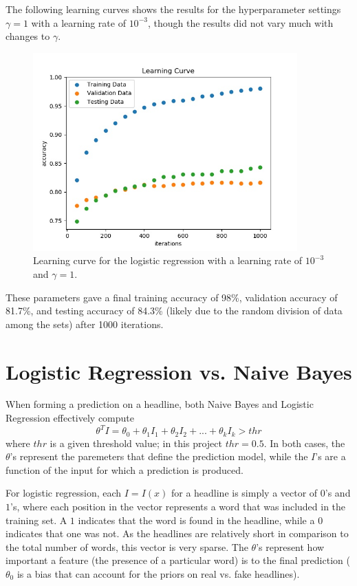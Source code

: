\documentclass{article}
\begin{document}
   The following learning curves shows the results for the hyperparameter settings $\gamma = 1$ with a learning
   rate of $10^{-3}$, though the results did not vary much with changes to $\gamma$.
   \begin{figure}[h] \centering
      \includegraphics[width=4in]{resources/part4}
      \caption{ Learning curve for the logistic regression with a learning rate of $10^{-3}$ and
            $\gamma = 1$.}
   \end{figure}

   These parameters gave a final training accuracy of 98\%, validation accuracy of 81.7\%, and testing
   accuracy of 84.3\% (likely due to the random division of data among the sets) after 1000 iterations.



   \section{Logistic Regression vs. Naive Bayes}
   When forming a prediction on a headline, both Naive Bayes and Logistic Regression effectively compute
   \begin{equation*}
      \theta^T I = \theta_0 + \theta_1 I_1 + \theta_2 I_2 + ... + \theta_k I_k > thr
   \end{equation*}
   where $thr$ is a given threshold value; in this project $thr = 0.5$. In both cases, the $\theta$'s represent
   the paremeters that define the prediction model, while the $I$'s are a function of the input for which a
   prediction is produced.

   For logistic regression, each $I = I(x)$ for a headline is simply a vector of $0$'s and $1$'s, where each
   position in the vector represents a word that was included in the training set. A $1$ indicates that the
   word is found in the headline, while a $0$ indicates that one was not. As the headlines are relatively short
   in comparison to the total number of words, this vector is very sparse. The $\theta$'s represent how important
   a feature (the presence of a particular word) is to the final prediction ($\theta_0$ is a bias that can
   account for the priors on real vs. fake headlines).
\end{document}
